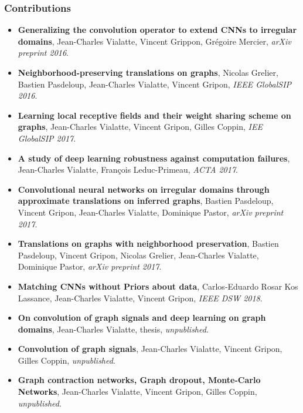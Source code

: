 \documentclass[t,9pt,pdftex]{beamer}
\theoremstyle{definition}
\begin{document}
\begin{frame}[c, label=current]
 \frametitle{Contributions}
 {\small
  \begin{itemize}
    \item \textbf{Generalizing the convolution operator to extend CNNs to irregular domains}, Jean-Charles Vialatte, Vincent Grippon, Grégoire Mercier, \textit{arXiv preprint 2016}.
    \item \textbf{Neighborhood-preserving translations on graphs}, Nicolas Grelier, Bastien Pasdeloup, Jean-Charles Vialatte, Vincent Gripon, \textit{IEEE GlobalSIP 2016}.
    \item \textbf{Learning local receptive fields and their weight sharing scheme on graphs}, Jean-Charles Vialatte, Vincent Gripon, Gilles Coppin, \textit{IEE GlobalSIP 2017}.
    \item \textbf{A study of deep learning robustness against computation failures}, Jean-Charles Vialatte, François Leduc-Primeau, \textit{ACTA 2017}.
    \item \textbf{Convolutional neural networks on irregular domains through approximate translations on inferred graphs}, Bastien Pasdeloup, Vincent Gripon, Jean-Charles Vialatte, Dominique Pastor, \textit{arXiv preprint 2017}.
    \item \textbf{Translations on graphs with neighborhood preservation}, Bastien Pasdeloup, Vincent Gripon, Nicolas Grelier, Jean-Charles Vialatte, Dominique Pastor, \textit{arXiv preprint 2017}.
    \item \textbf{Matching CNNs without Priors about data}, Carlos-Eduardo Rosar Kos Lassance, Jean-Charles Vialatte, Vincent Gripon, \textit{IEEE DSW 2018}.
    \item \textbf{On convolution of graph signals and deep learning on graph domains}, Jean-Charles Vialatte, thesis, \textit{unpublished}.
    \item \textbf{Convolution of graph signals}, Jean-Charles Vialatte, Vincent Gripon, Gilles Coppin, \textit{unpublished}.
    \item \textbf{Graph contraction networks, Graph dropout, Monte-Carlo Networks}, Jean-Charles Vialatte, Vincent Gripon, Gilles Coppin, \textit{unpublished}.
  \end{itemize}
 }
\end{frame}
\end{document}
